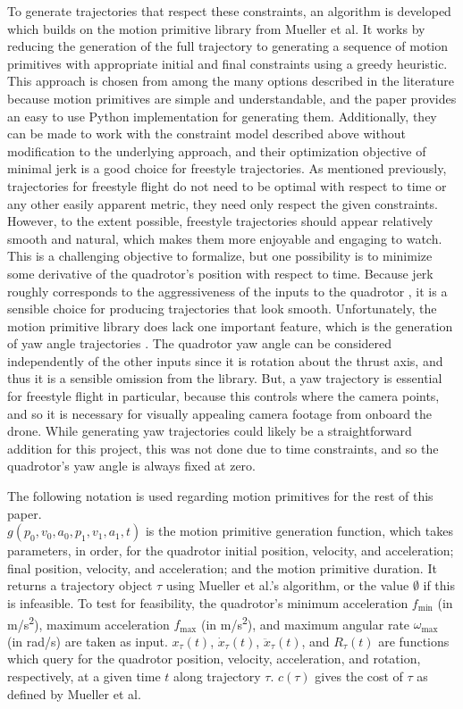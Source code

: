 \documentclass[pageno]{jpaper}
\begin{document}
To generate trajectories that respect these constraints, an algorithm is developed which builds on the motion primitive library from Mueller et al. It works by reducing the generation of the full trajectory to generating a sequence of motion primitives with appropriate initial and final constraints using a greedy heuristic. This approach is chosen from among the many options described in the literature because motion primitives are simple and understandable, and the paper provides an easy to use Python implementation for generating them. Additionally, they can be made to work with the constraint model described above without modification to the underlying approach, and their optimization objective of minimal jerk is a good choice for freestyle trajectories. As mentioned previously, trajectories for freestyle flight do not need to be optimal with respect to time or any other easily apparent metric, they need only respect the given constraints. However, to the extent possible, freestyle trajectories should appear relatively smooth and natural, which makes them more enjoyable and engaging to watch. This is a challenging objective to formalize, but one possibility is to minimize some derivative of the quadrotor's position with respect to time. Because jerk roughly corresponds to the aggressiveness of the inputs to the quadrotor \cite{mueller}, it is a sensible choice for producing trajectories that look smooth. Unfortunately, the motion primitive library does lack one important feature, which is the generation of yaw angle trajectories \cite{mueller}. The quadrotor yaw angle can be considered independently of the other inputs since it is rotation about the thrust axis, and thus it is a sensible omission from the library. But, a yaw trajectory is essential for freestyle flight in particular, because this controls where the camera points, and so it is necessary for visually appealing camera footage from onboard the drone. While generating yaw trajectories could likely be a straightforward addition for this project, this was not done due to time constraints, and so the quadrotor's yaw angle is always fixed at zero.

The following notation is used regarding motion primitives for the rest of this paper. \\ $g(p_0, v_0, a_0, p_1, v_1, a_1, t)$ is the motion primitive generation function, which takes parameters, in order, for the quadrotor initial position, velocity, and acceleration; final position, velocity, and acceleration; and the motion primitive duration. It returns a trajectory object $\tau$ using Mueller et al.'s algorithm, or the value $\emptyset$ if this is infeasible. To test for feasibility, the quadrotor's minimum acceleration $f_{\min}$ (in \unit{m/s^2}), maximum acceleration $f_{\max}$ (in \unit{m/s^2}), and maximum angular rate $\omega_{\max}$ (in \unit{rad/s}) are taken as input. $x_{\tau}(t)$, $\dot x_{\tau}(t)$, $\ddot x_{\tau}(t)$, and $R_{\tau}(t)$ are functions which query for the quadrotor position, velocity, acceleration, and rotation, respectively, at a given time $t$ along trajectory $\tau$. $c(\tau)$ gives the cost of $\tau$ as defined by Mueller et al.
\end{document}
